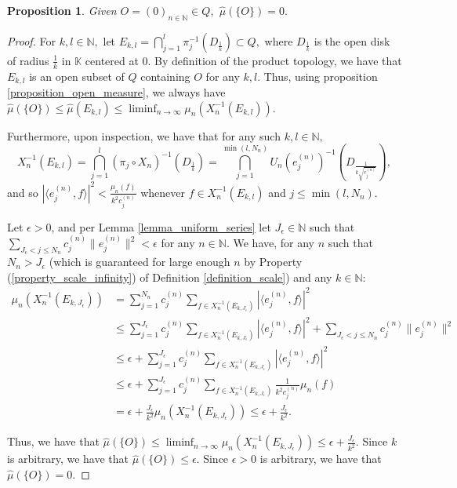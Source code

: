 \documentclass[10pt,a4paper]{amsart}
\newtheorem{prop}[thm]{Proposition}
\def \HMU{\hat{\mu}}
\def \LL{\langle}
\def \RR{\rangle}
\begin{document}
\begin{prop}\label{proposition_null_origin}
	Given $O=(0)_{n\in\mathbb{N}}\in Q,$ $\HMU(\{O\})=0.$
\end{prop}
\begin{proof}
		For $k,l\in\mathbb{N},$ let $E_{k,l}=\bigcap_{j=1}^l \pi_j^{-1}(D_{\frac{1}{k}})\subset Q,$ where $D_{\frac{1}{k}}$ is the open disk of radius $\frac{1}{k}$ in $\mathbb{K}$ centered at $0$. By definition of the product topology, we have that $E_{k,l}$ is an open subset of $Q$ containing $O$ for any $k,l$.  Thus, using proposition \ref{proposition_open_measure}, we always have $\HMU(\{O\})\leq \HMU(E_{k,l})\leq \liminf_{n\rightarrow\infty} \mu_n(X_n^{-1}(E_{k,l})).$
		
		Furthermore, upon inspection, we have that for any such $k,l\in \mathbb{N},$  $$X_n^{-1}(E_{k,l})=\bigcap_{j=1}^l (\pi_j\circ X_n)^{-1}(D_{\frac{1}{k}})=\bigcap_{j=1}^{\min(l,N_n)} U_n(e_j^{(n)})^{-1}(D_{\frac{1}{k\sqrt{c_j^{(n)}}}}),$$ and so $|\LL e_j^{(n)}, f\RR|^2 < \frac{\mu_n(f)}{k^2 c_j^{(n)}}$ whenever $f\in X_n^{-1}(E_{k,l})$ and $j\leq \min(l,N_n).$ 
		
		Let $\epsilon>0$, and per Lemma \ref{lemma_uniform_series} let $J_{\epsilon}\in\mathbb{N}$ such that $\sum_{J_{\epsilon}<j\leq N_n}c_j^{(n)}\|e_j^{(n)}\|^2<\epsilon$ for any $n\in \mathbb{N}.$ We have, for any $n$ such that $N_n>J_{\epsilon}$ (which is guaranteed for large enough $n$ by Property (\ref{property_scale_infinity}) of Definition \ref{definition_scale}) and any $k\in\mathbb{N}$:
		\begin{align*}
				\mu_n(X_n^{-1}(E_{k,J_{\epsilon}}))&=\sum_{j=1}^{N_n}c_j^{(n)}\sum_{f\in X_n^{-1}(E_{k,J_{\epsilon}})} |\LL e_j^{(n)}, f\RR|^2\\
				&\leq \sum_{j=1}^{J_{\epsilon}}c_j^{(n)}\sum_{f\in X_n^{-1}(E_{k,J_{\epsilon}})} |\LL e_j^{(n)}, f\RR|^2+\sum_{J_{\epsilon}<j\leq N_n}c_j^{(n)}\|e_j^{(n)}\|^2\\
				&\leq \epsilon+\sum_{j=1}^{J_{\epsilon}}c_j^{(n)}\sum_{f\in X_n^{-1}(E_{k,J_{\epsilon}})} |\LL e_j^{(n)}, f\RR|^2\\
				&\leq\epsilon+\sum_{j=1}^{J_{\epsilon}}c_j^{(n)}\sum_{f\in X_n^{-1}(E_{k,J_{\epsilon}})}\frac{1}{k^2c_j^{(n)}}\mu_n(f)\\
				&=\epsilon+\frac{J_{\epsilon}}{k^2}\mu_n(X_n^{-1}(E_{k,J_{\epsilon}}))\leq \epsilon+\frac{J_{\epsilon}}{k^2}. 
			\end{align*}  
		
		Thus, we have that $\HMU(\{O\})\leq\liminf_{n\rightarrow\infty} \mu_n(X_n^{-1}(E_{k,J_{\epsilon}}))\leq \epsilon+\frac{J_{\epsilon}}{k^2}.$ Since $k$ is arbitrary, we have that $\HMU(\{O\})\leq\epsilon.$ Since $\epsilon>0$ is arbitrary, we have that $\HMU(\{O\})=0.$
\end{proof}
\end{document}
